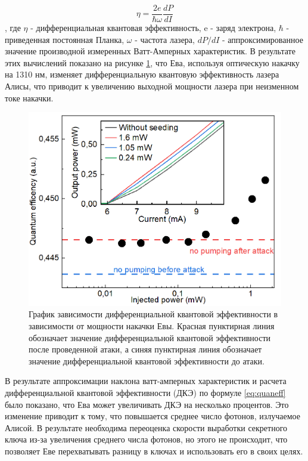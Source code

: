 \begin{equation}
\eta = \frac{2e}{\hbar\omega}\frac{dP}{dI}
\label{eq:quaneff}
\end{equation}, 
где $\eta$ - дифференциальная квантовая эффективность, e - заряд электрона, $\hbar$ - приведенная постоянная Планка, $\omega$ - частота лазера, $dP/dI$ - аппроксимированное значение производной измеренных Ватт-Амперных характеристик.
В результате этих вычислений показано на рисунке \ref{fig:diff quant eff ch4}, что Ева, используя оптическую накачку на 1310 нм, изменяет дифференциальную квантовую эффективность лазера Алисы, что приводит к увеличению выходной мощности лазера при неизменном токе накачки.
\begin{figure}
    \centering
    \includegraphics{images/Эффективность 1310.png}
    \caption{График зависимости дифференциальной квантовой эффективности в зависимости от мощности накачки Евы. Красная пунктирная линия обозначает значение дифференциальной квантовой эффективности после проведенной атаки, а синяя пунктирная линия обозначает значение дифференциальной квантовой эффективности до атаки.}
    \label{fig:diff quant eff ch4}
\end{figure}
В результате аппроксимации наклона ватт-амперных характеристик и расчета дифференциальной квантовой эффективности (ДКЭ) по формуле \ref{eq:quaneff} было показано, что Ева может увеличивать ДКЭ на несколько процентов. Это изменение приводит к тому, что повышается среднее число фотонов, излучаемое Алисой. В результате необходима переоценка скорости выработки секретного ключа из-за увеличения среднего числа фотонов, но этого не происходит, что позволяет Еве перехватывать разницу в ключах и использовать его в своих целях. 


